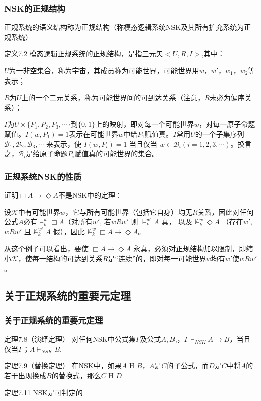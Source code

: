 \documentclass[CJK]{beamer}
\begin{document}
\begin{frame}
 \frametitle{NSK的正规结构}
正规系统的语义结构称为\alert{正规结构}（称模态逻辑系统NSK及其所有扩充系统为正规系统）

\begin{block}{定义7.2}
模态逻辑正规系统的正规结构，是指三元矢$<U,R,I>$,其中：

$U$为一非空集合，称为宇宙，其成员称为可能世界，可能世界用$w$，$w'$，$w_1$，$w_2$等表示；

$R$为$U$上的一个二元关系，称为可能世界间的可到达关系（注意，$R$未必为偏序关系）；

$I $为$U\times\{P_1,P_2,P_3,\cdots\}$到$\{0,1\}$上的映射，即对每一个可能世界$w$，对每一原子命题赋值。$ I(w, P_1)=1$表示在可能世界$w$中给$P_1$赋值真。$I$常用$U$的一个子集序列$\mathcal{B}_1,\mathcal{B}_2, \mathcal{B}_3,\cdots$ 来表示，使 $I(w, P_i)=1$ 当且仅当 $w\in \mathcal{B}_i (i=1,2,3,\cdots)$。换言之，$\mathcal{B}_i$是给原子命题$P_i$赋值真的可能世界的集合。
\end{block}
\end{frame}


\begin{frame}
 \frametitle{正规系统NSK的性质}
证明$\Box A \to \Diamond A$不是NSK中的定理：
\vspace{0.5em}

设$ \mathcal{K}$中有可能世界$w$，它与所有可能世界（包括它自身）均无$R$关系，因此对任何公式$A$必有$\vDash^w_k \Box A$（对所有$w'$, 若$wRw'$ 则 $\vDash^{w'}_k A$ 真， 以及$\nvDash^w_k \Diamond A$ （存在$w'$,$wRw'$ 且$\nvDash^{w'}_k A$ 假），因此$\nvDash^w_k \Box A \to \Diamond A$。
\vspace{0.5em}

从这个例子可以看出，要使 $\Box A \to \Diamond A$ 永真，必须对正规结构加以限制，即缩小$\mathcal{K}$，使每一结构的可达到关系$R$是“连续”的，即对每一可能世界$w$均有$w'$使$wRw'$。
\end{frame}

\subsection{关于正规系统的重要元定理}


\begin{frame}
 \frametitle{关于正规系统的重要元定理}
 \begin{block}{定理7.8（演绎定理）}
   对任何NSK中公式集$\Gamma$及公式$A,B$,，$\Gamma \vdash_{NSK} A \to B$，当且仅当$\Gamma$；$A \vdash_{NSK} B$.
 \end{block}
 \begin{block}{定理7.9（替换定理）}
   在NSK中，如果$A$ H $B$，$A$是$C$的子公式，而$D$是$C$中将$A$的若干出现换成$B$的替换式，那么$C$ H $D$
 \end{block}
 \begin{block}{定理7.11}
   NSK是可判定的
 \end{block}

\end{frame}
\end{document}
